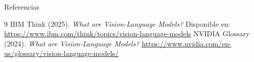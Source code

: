 \documentclass[aspectratio=169]{beamer}
\begin{document}
\begin{frame}{Referencias}
    \begin{thebibliography}{9}
         IBM Think (2025). \textit{What are Vision-Language Models?} Disponible en: \url{https://www.ibm.com/think/topics/vision-language-models}
         NVIDIA Glossary (2024). \textit{What are Vision-Language Models?} \url{https://www.nvidia.com/en-us/glossary/vision-language-models/}
    \end{thebibliography}
\end{frame}
\end{document}

